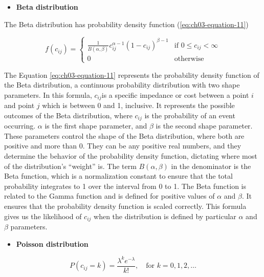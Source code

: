 \documentclass[
11pt, %
oneside, %
english, %
singlespacing, %
]{macthesis} %
\def\tightlist{}
\begin{document}
\begin{itemize}
\tightlist
\item
  \textbf{Beta distribution}
\end{itemize}

The Beta distribution has probability density function (\ref{eq:ch03-equation-11})

\begin{equation}
f(c_{ij}) = 
\begin{cases}
\frac{1}{B(\alpha, \beta)} c_{ij}^{\alpha - 1}(1 - c_{ij})^{\beta - 1} & \text{if } 0 \leq c_{ij} < \infty \\
0 & \text{otherwise}
\end{cases}
\label{eq:ch03-equation-11}
\end{equation}

The Equation \ref{eq:ch03-equation-11} represents the probability density function of the Beta distribution, a continuous probability distribution with two shape parameters. In this formula, \(c_{ij}\)is a specific impedance or cost between a point \(i\) and point \(j\) which is between 0 and 1, inclusive. It represents the possible outcomes of the Beta distribution, where \(c_{ij}\) is the probability of an event occurring. \(\alpha\) is the first shape parameter, and \(\beta\) is the second shape parameter. These parameters control the shape of the Beta distribution, where both are positive and more than 0. They can be any positive real numbers, and they determine the behavior of the probability density function, dictating where most of the distribution's ``weight'' is. The term \(B(\alpha, \beta)\) in the denominator is the Beta function, which is a normalization constant to ensure that the total probability integrates to 1 over the interval from 0 to 1. The Beta function is related to the Gamma function and is defined for positive values of \(\alpha\) and \(\beta\). It ensures that the probability density function is scaled correctly. This formula gives us the likelihood of \(c_{ij}\) when the distribution is defined by particular \(\alpha\) and \(\beta\) parameters.

\begin{itemize}
\tightlist
\item
  \textbf{Poisson distribution}
\end{itemize}

\begin{equation}
P(c_{ij} = k) = \frac{\lambda^k e^{-\lambda}}{k!}, \quad \text{for } k = 0, 1, 2, \ldots
\label{eq:ch03-equation-12}
\end{equation}
\end{document}
